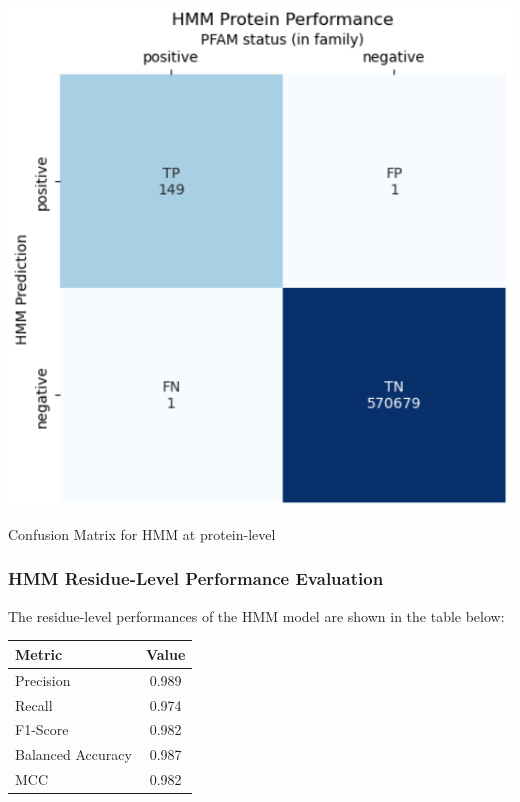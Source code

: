 \documentclass[10pt,twocolumn,letterpaper]{article}
\begin{document}
\begin{center}
    \includegraphics[scale=0.45]{report/img/hmm_prot_performance.png}
\end{center}

\begin{center}
    \small{Confusion Matrix for HMM at protein-level}
\end{center}

\subsubsection{HMM Residue-Level Performance Evaluation}

The residue-level performances of the HMM model are shown in the table below:

\begin{center}
    \begin{tabular}{lc}
        \toprule
        Metric & Value \\
        \midrule
        Precision & 0.989 \\
        Recall & 0.974 \\
        F1-Score & 0.982 \\
        Balanced Accuracy & 0.987 \\
        MCC & 0.982 \\
        \bottomrule
    \end{tabular}
\end{center} \\
\end{document}
